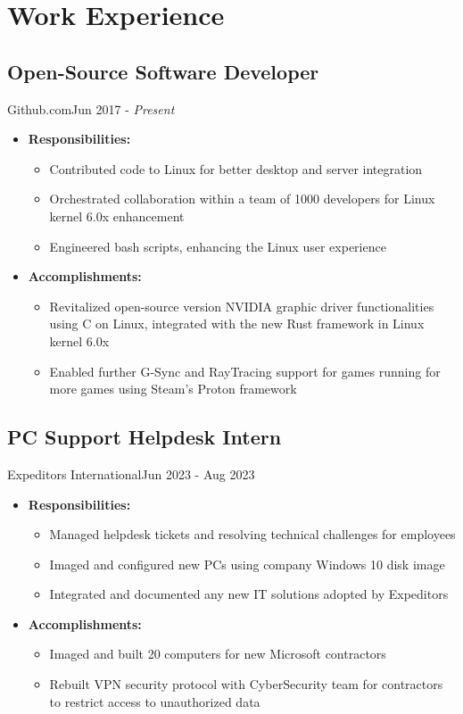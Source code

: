\section{Work Experience}
\subsection{Open-Source Software Developer}{Github.com}{Jun 2017 - \textit{Present}}
\begin{itemize}
    \item \textbf{Responsibilities:}
  \begin{itemize}
  \item Contributed code to Linux for better desktop and server integration
  \item Orchestrated collaboration within a team of 1000 developers for Linux kernel 6.0x enhancement
  \item Engineered bash scripts, enhancing the Linux user experience
  \end{itemize}
  \item{\textbf{Accomplishments:}}
  \begin{itemize}
  \item Revitalized open-source version NVIDIA graphic driver functionalities using C on Linux, integrated with the new Rust framework in Linux kernel 6.0x
  \item Enabled further G-Sync and RayTracing support for games running for more games using Steam's Proton framework
  \end{itemize}
\end{itemize}
\subsection{PC Support Helpdesk Intern}{Expeditors International}{Jun 2023 - Aug 2023}
\begin{itemize}
    \item \textbf{Responsibilities:}
    \begin{itemize}
    \item Managed helpdesk tickets and resolving technical challenges for employees
    \item Imaged and configured new PCs using company Windows 10 disk image
    \item Integrated and documented any new IT solutions adopted by Expeditors
    \end{itemize}
    \item \textbf{Accomplishments:}
    \begin{itemize}
        \item Imaged and built 20 computers for new Microsoft contractors
        \item Rebuilt VPN security protocol with CyberSecurity team for contractors to restrict access to unauthorized data
    \end{itemize}
\end{itemize}
